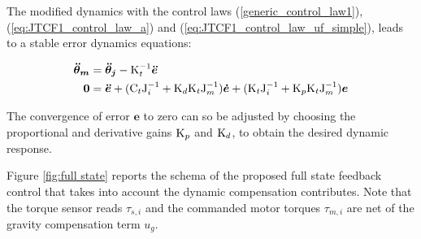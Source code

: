 \documentclass[journal]{IEEEtran}
\newcommand{\vectm}[1]{ { {\text #1} }}
\newcommand{\vects}[1]{{\boldsymbol {#1}}}
\begin{document}
	The modified dynamics with the control laws  (\ref{generic_control_law1}), (\ref{eq:JTCF1_control_law_a}) and (\ref{eq:JTCF1_control_law_uf_simple}), leads to a stable error dynamics equations:
	
	\begin{align}
	\vects{\ddot{\theta}_m} &= \vects{\ddot{\theta}_j} -\vectm{K_t^{-1}} \vects{\ddot{e}}
\\
	\vects{0} & = \vects{\ddot{e}} + ( \vectm{C_t} \vectm{J_i^{-1}} + \vectm{K_d} \vectm{K_t}  \vectm{J_m^{-1}})\vects{\dot{e}}+ ( \vectm{K_t} \vectm{J_i^{-1}}  + \vectm{K_p}  \vectm{K_t}  \vectm{J_m^{-1}})\vects{e}
	\end{align}
	
	The convergence of error $\vects{e}$ to zero can so be adjusted by choosing the proportional and derivative gains $\vectm{K_p}$ and $\vectm{K_d}$, to obtain the desired dynamic response.
	
	\par Figure \ref{fig:full state} reports the schema of the proposed full state feedback control that takes into account the dynamic compensation contributes. Note that the torque sensor reads $\tau_{s,i}$ and the commanded motor torques  $\tau_{m,i}$ are net of the gravity compensation term $u_g$.
	
\end{document}
